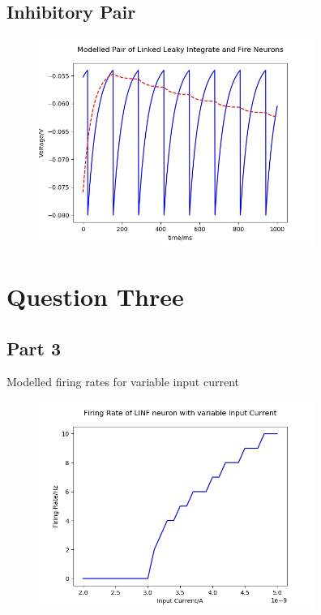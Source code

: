\documentclass[10pt]{article}
\begin{document}
    \subsection{Inhibitory Pair}
    \begin{figure}[H]
        \includegraphics[width=9cm ]{pairInGood.jpg}
        \label{fig:pairInGraph}
    \end{figure}


    \section{Question Three}
    \subsection{Part 3}
    Modelled firing rates for variable input current
    \begin{figure}[H]
        \includegraphics[width=9cm ]{firing.jpg}
        \label{fig:firingGraph}
    \end{figure}
\end{document}
